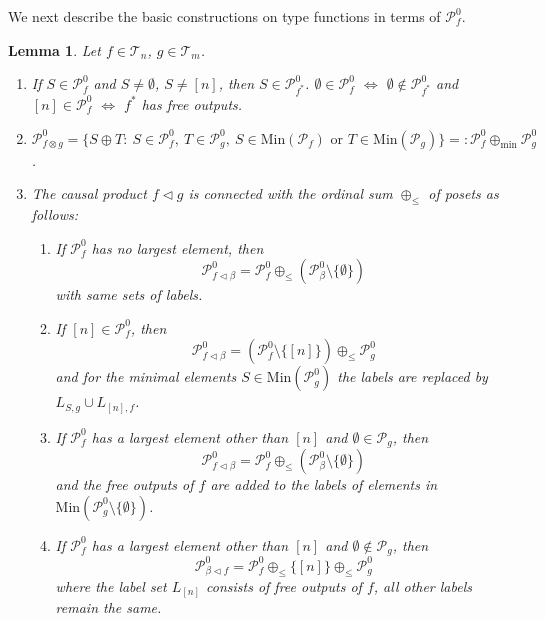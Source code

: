 \documentclass[12pt]{article}
\newtheorem{lemma}{Lemma}
\theoremstyle{definition}
\theoremstyle{remark}
\def\Te{\mathcal T}
\def\Pe{\mathcal P}
\def\vtl{\vartriangleleft}
\begin{document}
We next describe the basic constructions on type functions in terms of $\Pe_f^0$.


\begin{lemma}\label{lemma:p0_constr} Let $f\in \Te_{n}$, $g\in \Te_{m}$. 
\begin{enumerate}
\item[(i)] If $S\in \Pe_f^0$ and $S\ne \emptyset$, $S\ne [n]$, then $S\in \Pe^0_{f^*}$. 
 $\emptyset \in \Pe^0_f$ $\iff$ $\emptyset \notin \Pe^0_{f^*}$ and  $[n]\in
\Pe^0_f$ $\iff$ $f^*$ has  free outputs.
\item[(ii)] $\Pe^0_{f\otimes g}=\{S\oplus T:\ S\in \Pe_f^0,\ T\in \Pe_g^0, \ S\in
\mathrm{Min}(\Pe_f) \text{ or } T\in \mathrm{Min}(\Pe_g)\}=: \Pe_f^0\oplus_{\min} \Pe_g^0$.

\item[(iii)] The causal product $f\vtl g$ is connected with the ordinal sum $\oplus_\le$ of
posets as follows:
\begin{enumerate}
\item[(a)] If $\Pe_f^0$ has no largest element, then
\[
\Pe^0_{f\vtl \beta}=\Pe_f^0\oplus_\le (\Pe_{\beta}^0\setminus \{\emptyset\})
\]
with same sets of labels.
\item[(b)] If $[n]\in \Pe_f^0$, then 
\[
\Pe^0_{f\vtl \beta}=(\Pe_{f}^0\setminus \{[n]\})\oplus_\le \Pe_g^0
\]
and for the minimal elements $S\in \mathrm{Min}(\Pe_g^0)$ the labels are
replaced by $L_{S,g}\cup L_{[n],f}$.
\item[(c)] If $\Pe_f^0$ has a largest element other than $[n]$ and $\emptyset \in \Pe_g$,
then 
\[
\Pe^0_{f\vtl \beta}=\Pe_f^0\oplus_\le (\Pe_{\beta}^0\setminus \{\emptyset\})
\]
and the free outputs of $f$ are added to the labels of elements in
$\mathrm{Min}(\Pe_g^0\setminus\{\emptyset\})$.
\item[(d)] If $\Pe_f^0$ has a largest element other than $[n]$ and $\emptyset \notin 
\Pe_g$, then 
\[
\Pe^0_{\beta\vtl f} =\Pe_f^0\oplus_\le \{[n]\}\oplus_\le \Pe_g^0
\]
where the label set $L_{[n]}$ consists of free outputs of $f$, all other labels remain the
same.

\end{enumerate}



\end{enumerate}


\end{lemma}
\end{document}
